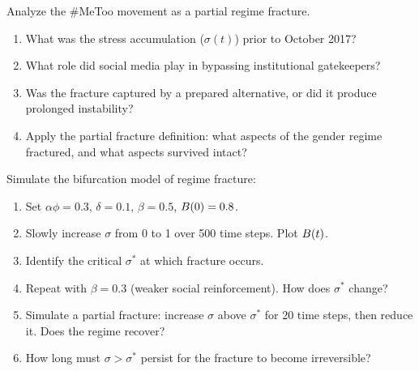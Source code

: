 \begin{exercise}
Analyze the \#MeToo movement as a partial regime fracture.
\begin{enumerate}[nosep]
  \item What was the stress accumulation ($\sigma(t)$) prior to October 2017?
  \item What role did social media play in bypassing institutional gatekeepers?
  \item Was the fracture captured by a prepared alternative, or did it produce prolonged instability?
  \item Apply the partial fracture definition: what aspects of the gender regime fractured, and what aspects survived intact?
\end{enumerate}
\end{exercise}

\begin{exercise}[Computational]
Simulate the bifurcation model of regime fracture:
\begin{enumerate}[nosep]
  \item Set $\alpha\phi = 0.3$, $\delta = 0.1$, $\beta = 0.5$, $B_{}(0) = 0.8$.
  \item Slowly increase $\sigma$ from 0 to 1 over 500 time steps. Plot $B_{}(t)$.
  \item Identify the critical $\sigma^*$ at which fracture occurs.
  \item Repeat with $\beta = 0.3$ (weaker social reinforcement). How does $\sigma^*$ change?
  \item Simulate a partial fracture: increase $\sigma$ above $\sigma^*$ for 20 time steps, then reduce it. Does the regime recover?
  \item How long must $\sigma > \sigma^*$ persist for the fracture to become irreversible?
\end{enumerate}
\end{exercise}
